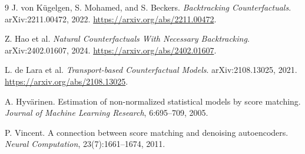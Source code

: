 \documentclass[10pt]{article}
\begin{document}
\begin{thebibliography}{9}
J. von K\"ugelgen, S. Mohamed, and S. Beckers.
\newblock \emph{Backtracking Counterfactuals}.
\newblock arXiv:2211.00472, 2022. \url{https://arxiv.org/abs/2211.00472}.

Z. Hao et al.
\newblock \emph{Natural Counterfactuals With Necessary Backtracking}.
\newblock arXiv:2402.01607, 2024. \url{https://arxiv.org/abs/2402.01607}.

L. de Lara et al.
\newblock \emph{Transport-based Counterfactual Models}.
\newblock arXiv:2108.13025, 2021. \url{https://arxiv.org/abs/2108.13025}.

A. Hyv\"arinen.
\newblock Estimation of non-normalized statistical models by score matching.
\newblock \emph{Journal of Machine Learning Research}, 6:695--709, 2005.

P. Vincent.
\newblock A connection between score matching and denoising autoencoders.
\newblock \emph{Neural Computation}, 23(7):1661--1674, 2011.
\end{thebibliography}
\end{document}
